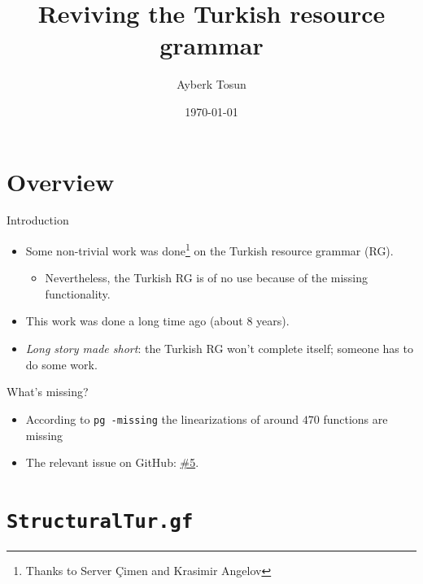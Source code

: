 \documentclass{beamer}
\title{Reviving the Turkish resource grammar}
\date{\today}
\author{Ayberk Tosun}
\institute{Fifth GF Summer School}
\newcommand{\issuelink}{https://github.com/GrammaticalFramework/GF/issues/5}
\begin{document}
  \maketitle

  \section{Overview}

  \begin{frame}{Introduction}
    \begin{itemize}
      \item<1-> Some non-trivial work was done\footnote{Thanks to Server
        \c{C}imen and Krasimir Angelov} on the Turkish resource grammar (RG).
        \begin{itemize}
          \item<2-> Nevertheless, the Turkish RG is of no use
            because of the missing functionality.
        \end{itemize}
      \item<3-> This work was done a long time ago (about $8$ years).
      \item<4-> \emph{Long story made short}: the Turkish RG won't complete
        itself; someone has to do some work.
    \end{itemize}
  \end{frame}

  \begin{frame}{What's missing?}
    \begin{itemize}
      \item<1-> According to \texttt{pg -missing} the linearizations of around
        $470$ functions are missing
      \item<2-> The relevant issue on GitHub: \href{\issuelink}{\alert{\#5}}.
    \end{itemize}
  \end{frame}

  \section{\texttt{StructuralTur.gf}}
\end{document}
